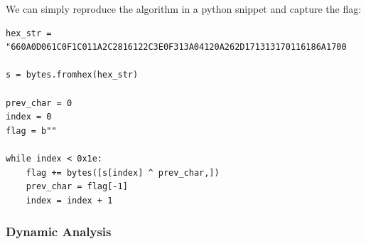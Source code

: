 \documentclass{article}
\begin{document}
\noindent\linebreak
We can simply reproduce the algorithm in a python snippet and capture the flag:
\begin{verbatim}
hex_str = "660A0D061C0F1C011A2C2816122C3E0F313A04120A262D171313170116186A1700

s = bytes.fromhex(hex_str)

prev_char = 0
index = 0
flag = b""

while index < 0x1e:
    flag += bytes([s[index] ^ prev_char,])
    prev_char = flag[-1]
    index = index + 1
\end{verbatim}

\pagebreak

\subsubsection{Dynamic Analysis}















\end{document}
